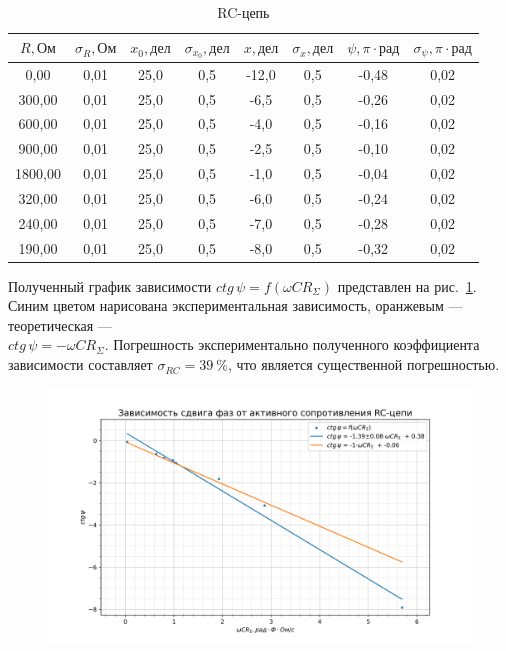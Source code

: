\documentclass[a4paper, 12pt]{article}
\begin{document}
\begin{table}[h!]
\begin{center}
\begin{tabular}{|c|c|c|c|c|c|c|c|}
\hline
$R, Ом$   & $\sigma_R, Ом$ & $x_0, дел$ & $\sigma_{x_0}, дел$ & $x, дел$ & $\sigma_x, дел$ & $\psi, \pi \cdot рад$ & $\sigma_{\psi}, \pi \cdot рад$ \\ \hline
0,00    & 0,01   & 25,0    & 0,5      & -12,0  & 0,5     & -0,48       & 0,02        \\ \hline
300,00  & 0,01   & 25,0    & 0,5      & -6,5   & 0,5     & -0,26       & 0,02        \\ \hline
600,00  & 0,01   & 25,0    & 0,5      & -4,0   & 0,5     & -0,16       & 0,02        \\ \hline
900,00  & 0,01   & 25,0    & 0,5      & -2,5   & 0,5     & -0,10       & 0,02        \\ \hline
1800,00 & 0,01   & 25,0    & 0,5      & -1,0   & 0,5     & -0,04       & 0,02        \\ \hline
320,00  & 0,01   & 25,0    & 0,5      & -6,0   & 0,5     & -0,24       & 0,02        \\ \hline
240,00  & 0,01   & 25,0    & 0,5      & -7,0   & 0,5     & -0,28       & 0,02        \\ \hline
190,00  & 0,01   & 25,0    & 0,5      & -8,0   & 0,5     & -0,32       & 0,02        \\ \hline
\end{tabular}
\end{center}
\caption{RC-цепь}
\label{tab1}
\end{table}

Полученный график зависимости $ctg\,\psi = f(\omega CR_{\Sigma})$ представлен на рис.~\ref{ris1}. Синим цветом нарисована экспериментальная зависимость, оранжевым --- теоретическая --- \\ $ctg\,\psi = - \omega CR_{\Sigma}$. Погрешность экспериментально полученного коэффициента зависимости составляет $\sigma_{RC} = 39~\%$, что является существенной погрешностью.

\begin{figure}[h!]
\begin{flushleft}
    \includegraphics[scale=0.7]{3.2.1_1.png}
\end{flushleft}
\caption{}
\label{ris1}
\end{figure}
\end{document}
